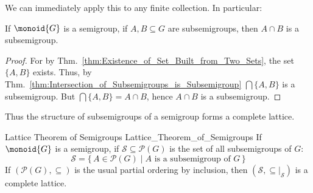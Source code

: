         We can immediately apply this to any finite collection. In particular:
        \begin{theorem}
            \label{thm:Intersection_of_Two_Subsemigroups_is_Subsemigroup}%
            If $\monoid{G}$ is a semigroup, if $A,B\subseteq{G}$ are
            subsemigroups, then $A\cap{B}$ is a subsemigroup.
        \end{theorem}
        \begin{proof}
            For by Thm.~\ref{thm:Existence_of_Set_Built_from_Two_Sets}, the set
            $\{A,B\}$ exists. Thus, by
            Thm.~\ref{thm:Intersection_of_Subsemigroups_is_Subsemigroup}
            $\bigcap\{A,B\}$ is a subsemigroup. But
            $\bigcap\{A,B\}=A\cap{B}$, hence $A\cap{B}$ is a subsemigroup.
        \end{proof}
        Thus the structure of subsemigroups of a semigroup forms a complete
        lattice.
        \begin{ltheorem}{Lattice Theorem of Semigroups}
                        {Lattice_Theorem_of_Semigroups}
            If $\monoid{G}$ is a semigroup, if
            $\mathcal{S}\subseteq\mathcal{P}(G)$ is the set of all subsemigroups
            of $G$:
            \begin{equation}
                \mathcal{S}=\{\,A\in\mathcal{P}(G)\;|\;
                    A\textrm{ is a subsemigroup of }G\,\}
            \end{equation}
            If $(\mathcal{P}(G),\subseteq)$ is the usual partial ordering by
            inclusion, then $(\mathcal{S},\subseteq|_{\mathcal{S}})$ is a
            complete lattice.
        \end{ltheorem}
